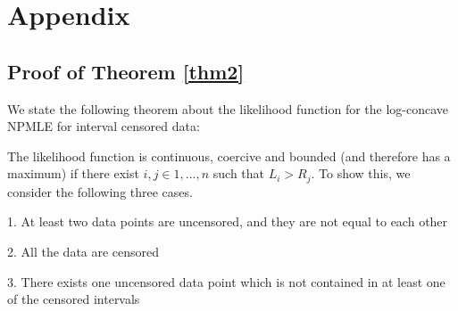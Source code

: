 



{\section{Appendix}  	
\label{sec:app}	}

	\subsection{Proof of Theorem \ref{thm2}}
	
	We state the following theorem about the likelihood function for the log-concave NPMLE for interval censored data:
		
	The likelihood function is continuous, coercive and bounded (and therefore has a maximum) if there exist $i,j \in 1, ... , n$ such that $L_i > R_j$. To show this, we consider the following three cases.
	
	1. At least two data points are uncensored, and they are not equal to each other
	
	2. All the data are censored
	
	3. There exists one uncensored data point which is not contained in at least one of the censored intervals
		
